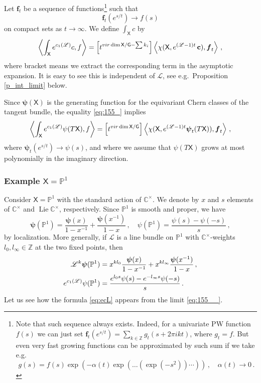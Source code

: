 \documentclass[14pt]{extarticle}
\newcommand{\Ct}{\mathbb{C}^\times}
\newcommand{\Z}{\mathbb{Z}}
\newcommand{\bG}{\mathsf{G}}
\newcommand{\bX}{\mathsf{X}}
\newcommand{\bP}{\mathbb{P}}
\newcommand{\cL}{\mathscr{L}}
\newcommand{\bpsi}{\boldsymbol{\psi}}
\newcommand{\bbc}{\mathbf{c}}
\newcommand{\vir}{\textup{vir}}
\DeclareMathOperator{\Lie}{Lie}
\theoremstyle{definition}
\begin{document}
  Let $\boldsymbol{f}_t$ be a sequence of functions\footnote{
    Note that such sequence always exists. Indeed, for a
    univariate PW function $f(s)$ we can just set
    $\boldsymbol{f}_t(e^{s/t}) = \sum_{k\in \Z} g_t(s+2\pi i k t)$,
    where $g_t=f$. But even very fast growing functions can be
    approximated by such sum if we take e.g.\ 
    \[
      g(s) = f(s) \exp(- \alpha(t) \exp(\dots (\exp(-s^2))\cdots))\,, \quad \alpha(t)
    \to 0 \,. 
    \]
}
  such
that
%
\begin{equation}
  \label{eq:158}
  \boldsymbol{f}_t(e^{s/t}) \to 
      f(s) 
\end{equation}
%
on compact sets as $t\to \infty$.  We define $\int_\bX c$ by 
%
\begin{equation}
  \label{eq:155_}
  \left\langle \int_\bX e^{c_1(\cL)} c, f \right\rangle = \left[ t^{\vir \dim
      \bX/\bG-\sum k_i}\right]
  \left\langle \chi(\bX,e^{(\cL-1)t}  \, \bbc),  \boldsymbol{f}_t\right\rangle \,, 
\end{equation}
%
where bracket means we extract the corresponding term in the
asymptotic expansion. It is easy to see this is independent of $\cL$,
see e.g.\  Proposition \ref{p_int_limit} below.

Since $\bpsi(\bX)$ is the generating function for the equivariant
Chern classes of the tangent bundle, the equality \eqref{eq:155_}
implies
%
\begin{equation}
  \label{eq:155__}
  \left\langle \int_\bX e^{c_1(\cL)} \psi(T\bX), f \right\rangle = \left[ t^{\vir \dim
      \bX/\bG}\right]
  \left\langle \chi(\bX,e^{(\cL-1)t} \bpsi_t(T\bX)),  \boldsymbol{f}_t\right\rangle \,, 
\end{equation}
%
where $\bpsi_t(e^{s/t}) \to  \psi(s)$, and  where we assume that
$\psi(T\bX)$ grows at most polynomially in the imaginary direction. 

\subsubsection{Example $\bX=\bP^1$}

Consider $\bX=\bP^1$ with the standard action of $\Ct$. We denote by
$x$ and $s$ elements of $\Ct$ and $\Lie \Ct$, respectively. Since
$\bP^1$ is smooth and proper, we have
%
\begin{equation}
  \label{eq:83}
  \bpsi(\bP^1) = \frac{\bpsi(x)}{1-x^{-1}} +
  \frac{\bpsi(x^{-1})}{1-x}\,, \quad
  \psi(\bP^1) = \frac{\psi(s)-\psi(-s)}{s} \,, 
\end{equation}
%
by localization. More generally, if $\cL$ is a line bundle on $\bP^1$
with $\Ct$-weights $l_0,l_\infty\in \Z$ at the two fixed
points, then
%
\begin{align}
 \cL^k \bpsi(\bP^1) &= x^{k l_0}  \frac{\bpsi(x)}{1-x^{-1}} +
  x^{k l_\infty} \frac{\bpsi(x^{-1})}{1-x}\,, \notag \\ 
  e^{c_1(\cL)} \psi(\bP^1) &= \frac{e^{l_0 s}\psi(s)-e^{-l_\infty
                             s}\psi(-s)}{s} \,. \label{eq:ecL} 
\end{align}
%
Let us see how the formula \eqref{eq:ecL} appears from the limit
\eqref{eq:155__}.
\end{document}
